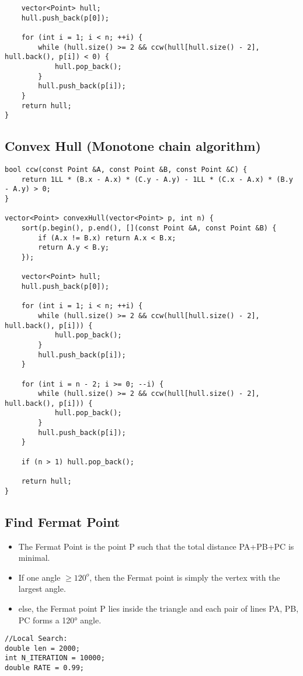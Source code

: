 \documentclass[11pt,a4paper]{article}
\begin{document}
\begin{multicols*}{2}
\begin{lstlisting}
    vector<Point> hull;
    hull.push_back(p[0]);

    for (int i = 1; i < n; ++i) {
        while (hull.size() >= 2 && ccw(hull[hull.size() - 2], hull.back(), p[i]) < 0) {
            hull.pop_back();
        }
        hull.push_back(p[i]);
    }
    return hull;
}
\end{lstlisting}

\subsection{Convex Hull (Monotone chain algorithm)}
\begin{lstlisting}
bool ccw(const Point &A, const Point &B, const Point &C) {
    return 1LL * (B.x - A.x) * (C.y - A.y) - 1LL * (C.x - A.x) * (B.y - A.y) > 0;
}

vector<Point> convexHull(vector<Point> p, int n) {
    sort(p.begin(), p.end(), [](const Point &A, const Point &B) {
        if (A.x != B.x) return A.x < B.x;
        return A.y < B.y;
    });

    vector<Point> hull;
    hull.push_back(p[0]);

    for (int i = 1; i < n; ++i) {
        while (hull.size() >= 2 && ccw(hull[hull.size() - 2], hull.back(), p[i])) {
            hull.pop_back();
        }
        hull.push_back(p[i]);
    }

    for (int i = n - 2; i >= 0; --i) {
        while (hull.size() >= 2 && ccw(hull[hull.size() - 2], hull.back(), p[i])) {
            hull.pop_back();
        }
        hull.push_back(p[i]);
    }

    if (n > 1) hull.pop_back();

    return hull;
}
\end{lstlisting}
\subsection{Find Fermat Point}
\begin{itemize}
    \item The Fermat Point is the point P such that the total distance PA+PB+PC is minimal.
    \item If one angle $\geq 120^o$, then the Fermat point is simply the vertex with the largest angle.
    \item else, the Fermat point P lies inside the triangle and each pair of lines PA, PB, PC forms a 120° angle.
\end{itemize}
\begin{lstlisting}
//Local Search:
double len = 2000;  
int N_ITERATION = 10000;  
double RATE = 0.99;  


\end{lstlisting}
\end{multicols*}
\end{document}
